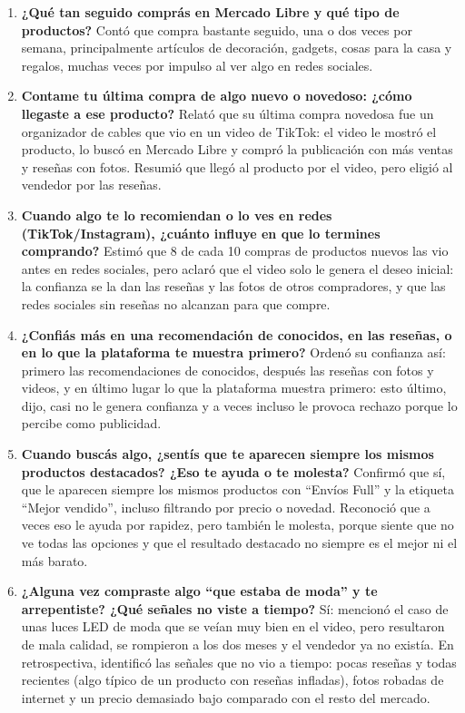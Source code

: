 \begin{enumerate}
	\item \textbf{¿Qué tan seguido comprás en Mercado Libre y qué tipo de productos?} Contó que compra bastante seguido, una o dos veces por semana, principalmente artículos de decoración, gadgets, cosas para la casa y regalos, muchas veces por impulso al ver algo en redes sociales.
	\item \textbf{Contame tu última compra de algo nuevo o novedoso: ¿cómo llegaste a ese producto?} Relató que su última compra novedosa fue un organizador de cables que vio en un video de TikTok: el video le mostró el producto, lo buscó en Mercado Libre y compró la publicación con más ventas y reseñas con fotos. Resumió que llegó al producto por el video, pero eligió al vendedor por las reseñas.
	\item \textbf{Cuando algo te lo recomiendan o lo ves en redes (TikTok/Instagram), ¿cuánto influye en que lo termines comprando?} Estimó que 8 de cada 10 compras de productos nuevos las vio antes en redes sociales, pero aclaró que el video solo le genera el deseo inicial: la confianza se la dan las reseñas y las fotos de otros compradores, y que las redes sociales sin reseñas no alcanzan para que compre.
	\item \textbf{¿Confiás más en una recomendación de conocidos, en las reseñas, o en lo que la plataforma te muestra primero?} Ordenó su confianza así: primero las recomendaciones de conocidos, después las reseñas con fotos y videos, y en último lugar lo que la plataforma muestra primero: esto último, dijo, casi no le genera confianza y a veces incluso le provoca rechazo porque lo percibe como publicidad.
	\item \textbf{Cuando buscás algo, ¿sentís que te aparecen siempre los mismos productos destacados? ¿Eso te ayuda o te molesta?} Confirmó que sí, que le aparecen siempre los mismos productos con ``Envíos Full'' y la etiqueta ``Mejor vendido'', incluso filtrando por precio o novedad. Reconoció que a veces eso le ayuda por rapidez, pero también le molesta, porque siente que no ve todas las opciones y que el resultado destacado no siempre es el mejor ni el más barato.
	\item \textbf{¿Alguna vez compraste algo ``que estaba de moda'' y te arrepentiste? ¿Qué señales no viste a tiempo?} Sí: mencionó el caso de unas luces LED de moda que se veían muy bien en el video, pero resultaron de mala calidad, se rompieron a los dos meses y el vendedor ya no existía. En retrospectiva, identificó las señales que no vio a tiempo: pocas reseñas y todas recientes (algo típico de un producto con reseñas infladas), fotos robadas de internet y un precio demasiado bajo comparado con el resto del mercado.

\end{enumerate}
